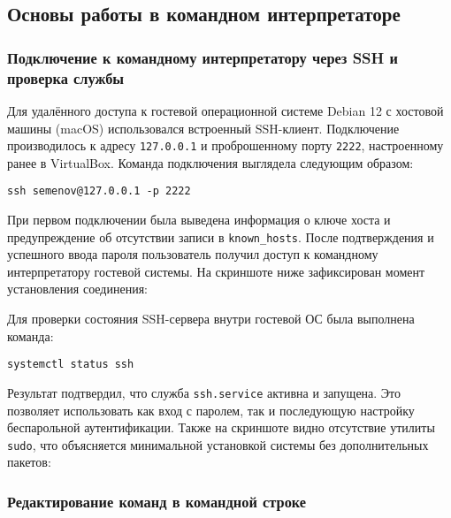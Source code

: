 \subsection{Основы работы в командном интерпретаторе}

\subsubsection*{Подключение к командному интерпретатору через SSH и проверка службы}

Для удалённого доступа к гостевой операционной системе Debian 12 с хостовой машины (macOS) использовался встроенный SSH-клиент. Подключение производилось к адресу \texttt{127.0.0.1} и проброшенному порту \texttt{2222}, настроенному ранее в VirtualBox. Команда подключения выглядела следующим образом:

\begin{verbatim}
ssh semenov@127.0.0.1 -p 2222
\end{verbatim}

При первом подключении была выведена информация о ключе хоста и предупреждение об отсутствии записи в \texttt{known\_hosts}. После подтверждения и успешного ввода пароля пользователь получил доступ к командному интерпретатору гостевой системы. На скриншоте ниже зафиксирован момент установления соединения:


Для проверки состояния SSH-сервера внутри гостевой ОС была выполнена команда:

\begin{verbatim}
systemctl status ssh
\end{verbatim}

Результат подтвердил, что служба \texttt{ssh.service} активна и запущена. Это позволяет использовать как вход с паролем, так и последующую настройку беспарольной аутентификации. Также на скриншоте видно отсутствие утилиты \texttt{sudo}, что объясняется минимальной установкой системы без дополнительных пакетов:


\subsubsection*{Редактирование команд в командной строке}

